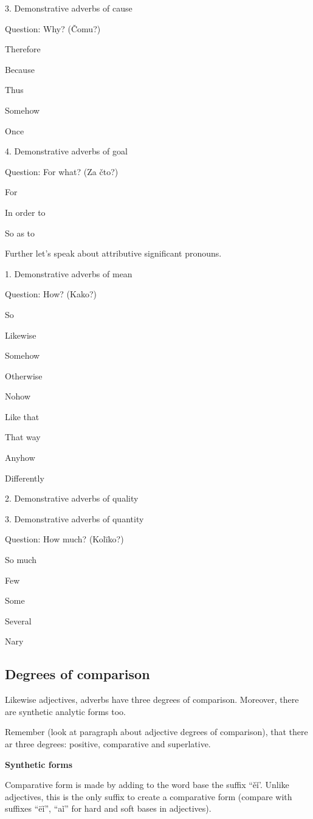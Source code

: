 3. Demonstrative adverbs of cause

Question: Why? (Čomu?)

Therefore

Because

Thus

Somehow

Once


4. Demonstrative adverbs of goal

Question: For what? (Za čto?)

For

In order to

So as to


Further let’s speak about attributive significant pronouns.

1. Demonstrative adverbs of mean

Question: How? (Kako?)

So

Likewise

Somehow

Otherwise

Nohow

Like that

That way

Anyhow

Differently

2. Demonstrative adverbs of quality


3. Demonstrative adverbs of quantity

Question: How much? (Kolïko?)

So much

Few

Some

Several

Nary

\subsection{Degrees of comparison}

Likewise adjectives, adverbs have three degrees of comparison. Moreover, there are synthetic analytic forms too. 

Remember (look at paragraph about adjective degrees of comparison), that there ar three degrees: positive, comparative and superlative.

\textbf{Synthetic forms}

Comparative form is made by adding to the word base the suffix “ěǐ’. Unlike adjectives, this is the only suffix to create a comparative form (compare with suffixes “ëǐ”, “aǐ” for hard and soft bases in adjectives). 

